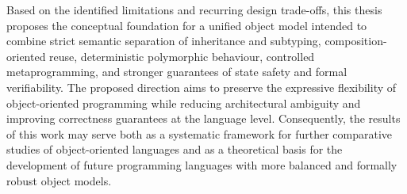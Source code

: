 Based on the identified limitations and recurring design trade-offs, this thesis proposes the conceptual foundation for a unified object model intended to combine strict semantic separation of inheritance and subtyping, composition-oriented reuse, deterministic polymorphic behaviour, controlled metaprogramming, and stronger guarantees of state safety and formal verifiability. The proposed direction aims to preserve the expressive flexibility of object-oriented programming while reducing architectural ambiguity and improving correctness guarantees at the language level. Consequently, the results of this work may serve both as a systematic framework for further comparative studies of object-oriented languages and as a theoretical basis for the development of future programming languages with more balanced and formally robust object models.
